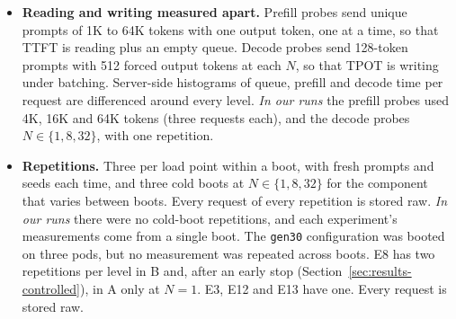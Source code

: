 \begin{itemize}
staggered over 5\,s in the scenarios with independent short prompts or a shared prefix (E8, E3, the prefix scenarios
of E12 and regimes A and B of E13), but not in the decode scenarios after long prompts of E12 or in regimes C and D
of E13. In E8 and E3 scenario A each user sent two requests and each level had at least eight, and in the decode
probes one per user and at least four. The minimum of two errors in the error rule applies to E12 and E13 only (the
second session's rerun of E3 kept the first session's rule to match its baseline), and the long-context and agent
sweeps stop at a TTFT p95 of 900\,s.
\item \textbf{Reading and writing measured apart.} Prefill probes send unique prompts of 1K to 64K tokens with one
output token, one at a time, so that TTFT is reading plus an empty queue. Decode probes send 128-token prompts with
512 forced output tokens at each $N$, so that TPOT is writing under batching. Server-side histograms of queue, prefill
and decode time per request are differenced around every level. \emph{In our runs} the prefill probes used 4K, 16K and
64K tokens (three requests each), and the decode probes $N\in\{1,8,32\}$, with one repetition.
\item \textbf{Repetitions.} Three per load point within a boot, with fresh prompts and seeds each time, and three cold
boots at $N\in\{1,8,32\}$ for the component that varies between boots. Every request of every repetition is stored
raw. \emph{In our runs} there were no cold-boot repetitions, and each experiment's measurements come from a single
boot. The \texttt{gen30} configuration was booted on three pods, but no measurement was repeated across boots. E8 has
two repetitions per level in B and, after an early stop (Section~\ref{sec:results-controlled}), in A only at $N=1$.
E3, E12 and E13 have one. Every request is stored raw.
\end{itemize}

